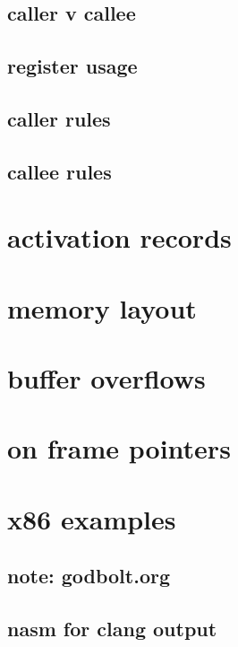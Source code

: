 \subsection{caller v callee}

\subsection{register usage}

\subsection{caller rules}
    




\subsection{callee rules}


\section{activation records}

\section{memory layout}

\section{buffer overflows}

\section{on frame pointers}

\section{x86 examples}

\subsection{note: godbolt.org}

\subsection{nasm for clang output}

